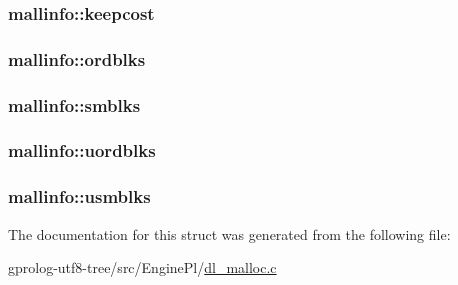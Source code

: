 \subsubsection[{\texorpdfstring{keepcost}{keepcost}}]{ mallinfo\+::keepcost}\hypertarget{structmallinfo_a9cd2ce910ff603217426d9b1b7c0e430}{}\label{structmallinfo_a9cd2ce910ff603217426d9b1b7c0e430}
\subsubsection[{\texorpdfstring{ordblks}{ordblks}}]{ mallinfo\+::ordblks}\hypertarget{structmallinfo_afaac6d1e005097fa1ed835684e23bfa7}{}\label{structmallinfo_afaac6d1e005097fa1ed835684e23bfa7}
\subsubsection[{\texorpdfstring{smblks}{smblks}}]{ mallinfo\+::smblks}\hypertarget{structmallinfo_a93076145f3f542dfe5e4e6d1e3feaf0b}{}\label{structmallinfo_a93076145f3f542dfe5e4e6d1e3feaf0b}
\subsubsection[{\texorpdfstring{uordblks}{uordblks}}]{ mallinfo\+::uordblks}\hypertarget{structmallinfo_a4676f74c10d8bf8b79585b04d520356f}{}\label{structmallinfo_a4676f74c10d8bf8b79585b04d520356f}
\subsubsection[{\texorpdfstring{usmblks}{usmblks}}]{ mallinfo\+::usmblks}\hypertarget{structmallinfo_a470a5e18a1f5eb3cac48020268ca49b8}{}\label{structmallinfo_a470a5e18a1f5eb3cac48020268ca49b8}


The documentation for this struct was generated from the following file\+:\begin{DoxyCompactItemize}
\item 
gprolog-\/utf8-\/tree/src/\+Engine\+Pl/\hyperlink{dl__malloc_8c}{dl\+\_\+malloc.\+c}\end{DoxyCompactItemize}
